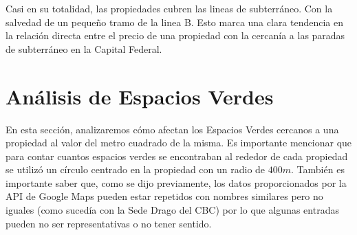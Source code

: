 \documentclass[a4paper, 10pt]{article}
\begin{document}
				
				Casi en su totalidad, las propiedades cubren las lineas de subterráneo. 
				Con la salvedad de un pequeño tramo de la linea B. Esto marca una clara tendencia en 
				la relación directa entre el precio de una propiedad con la cercanía a las 
				paradas de subterráneo en la Capital Federal.
				
		\section{Análisis de Espacios Verdes}
		En esta sección, analizaremos cómo afectan los Espacios Verdes cercanos a una propiedad al valor del metro cuadrado de la
		misma. Es importante mencionar que para contar cuantos espacios verdes se encontraban al rededor de cada propiedad se utilizó
		un círculo centrado en la propiedad con un radio de $400m$. También es importante saber que, como se dijo previamente, los
		datos proporcionados por la API de Google Maps pueden estar repetidos con nombres similares pero no iguales (como sucedía
		con la Sede Drago del CBC) por lo que algunas entradas pueden no ser representativas o no tener sentido.
\end{document}

